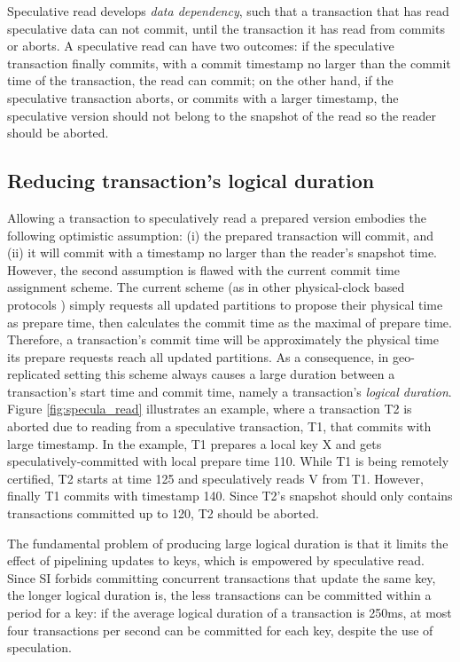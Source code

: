 Speculative read develops \textit{data dependency}, such that a transaction that has read speculative data can not commit, until the transaction it has read from commits or aborts. A speculative read can have two outcomes: if the speculative transaction finally commits, with a commit timestamp no larger than the commit time of the transaction, the read can commit; on the other hand, if the speculative transaction aborts, or commits with a larger timestamp, the speculative version should not belong to the snapshot of the read so the reader should be aborted.

\subsection{Reducing transaction's logical duration}
\label{sub:pc}
Allowing a transaction to speculatively read a prepared version embodies the following optimistic assumption: (i) the prepared transaction will commit, and (ii) it will commit with a timestamp no larger than the reader's snapshot time. However, the second assumption is flawed with the current commit time assignment scheme. The current scheme (as in other physical-clock based protocols \cite{spanner, cockroach, clocksi}) simply requests all updated partitions to propose their physical time as prepare time, then calculates the commit time as the maximal of prepare time. Therefore, a transaction's commit time will be approximately the physical time its prepare requests reach all updated partitions. As a consequence, in geo-replicated setting this scheme always causes a large duration between a transaction's start time and commit time, namely a transaction's \textit{logical duration}. Figure \ref{fig:specula_read} illustrates an example, where a transaction T2 is aborted due to reading from a speculative transaction, T1, that commits with large timestamp. In the example, T1 prepares a local key X and gets speculatively-committed with local prepare time 110. While T1 is being remotely certified, T2 starts at time 125 and speculatively reads V from T1. However, finally T1 commits with timestamp 140. Since T2's snapshot should only contains transactions committed up to 120, T2 should be aborted.

The fundamental problem of producing large logical duration is that it limits the effect of pipelining updates to keys, which is empowered by speculative read. Since SI forbids committing concurrent transactions that update the same key, the longer logical duration is, the less transactions can be committed within a period for a key: if the average logical duration of a transaction is 250ms, at most four transactions per second can be committed for each key, despite the use of speculation.

